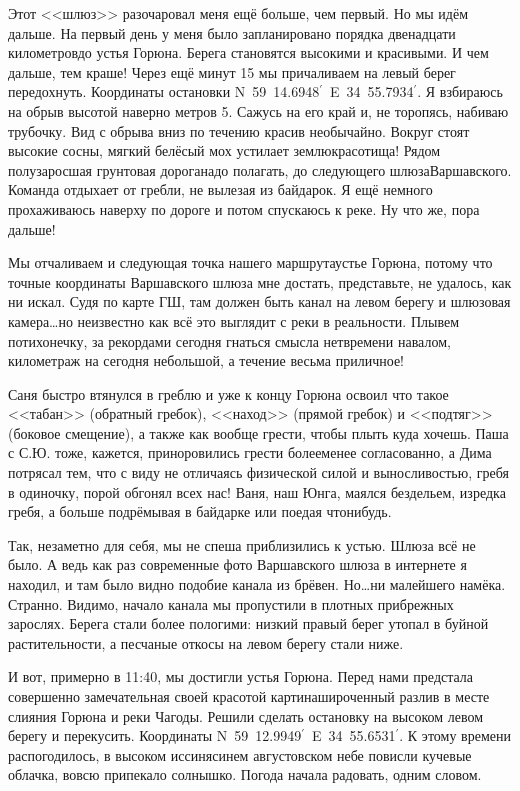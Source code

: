 Этот <<шлюз>> разочаровал меня ещё больше, чем первый. Но мы идём дальше. На первый день у меня было запланировано порядка двенадцати километров\mdash до устья Горюна. Берега становятся высокими и красивыми. И чем дальше, тем краше! Через ещё минут 15 мы причаливаем на левый берег передохнуть. Координаты остановки N~59\degree~14.6948$^\prime$~E~34\degree~55.7934$^\prime$. Я взбираюсь на обрыв высотой наверно метров 5. Сажусь на его край и, не торопясь, набиваю трубочку. Вид с обрыва вниз по течению красив необычайно. Вокруг стоят высокие сосны, мягкий белёсый мох устилает землю\mdash красотища! Рядом полузаросшая грунтовая дорога\mdash надо полагать, до следующего шлюза\mdash Варшавского. Команда отдыхает от гребли, не вылезая из байдарок. Я ещё немного прохаживаюсь наверху по дороге и потом спускаюсь к реке. Ну что же, пора дальше! 

Мы отчаливаем и следующая точка нашего маршрута\mdash устье Горюна, потому что точные координаты Варшавского шлюза мне достать, представьте, не удалось, как ни искал. Судя по карте ГШ, там должен быть канал на левом берегу и шлюзовая камера\ldots но неизвестно как всё это выглядит с реки в реальности. Плывем потихонечку, за рекордами сегодня гнаться смысла нет\mdash времени навалом, километраж на сегодня небольшой, а  течение весьма приличное! 

Саня быстро втянулся в греблю и уже к концу Горюна освоил что такое <<табан>> (обратный гребок), <<наход>> (прямой гребок) и <<подтяг>> (боковое смещение), а также как вообще грести, чтобы плыть куда хочешь. Паша с С.Ю. тоже, кажется, приноровились грести более\sdash менее согласованно, а Дима потрясал тем, что с виду не отличаясь физической силой и выносливостью, гребя в одиночку, порой обгонял всех нас! Ваня, наш Юнга, маялся бездельем, изредка гребя, а больше подрёмывая в байдарке или поедая что\sdash нибудь. 

Так, незаметно для себя, мы не спеша приблизились к устью. Шлюза всё не было. А ведь как раз современные фото Варшавского шлюза в интернете я находил, и там было видно подобие канала из брёвен. Но\ldots ни малейшего намёка. Странно. Видимо, начало канала мы пропустили в плотных прибрежных зарослях. Берега стали более пологими: низкий правый берег утопал в буйной растительности, а песчаные откосы на левом берегу стали ниже. 

И вот, примерно в 11:40, мы достигли устья Горюна. Перед нами предстала совершенно замечательная своей красотой картина\mdash широченный разлив в месте слияния Горюна и реки Чагоды. Решили сделать остановку на высоком левом берегу и перекусить. Координаты N~59\degree~12.9949$^\prime$~E~34\degree~55.6531$^\prime$. К этому времени распогодилось, в высоком иссиня\sdash синем августовском небе повисли кучевые облачка, вовсю припекало солнышко. Погода начала радовать, одним словом. 

